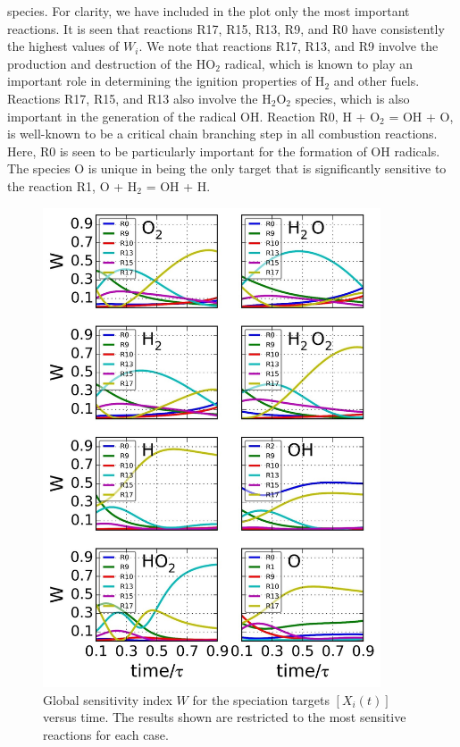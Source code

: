 species. For clarity, we have included in the plot only the most
important reactions. It is seen that reactions R17, R15, R13, R9,
and R0 have consistently the highest values of $W_i$. We note that
reactions R17, R13, and R9 involve the production and
destruction of the HO$_2$ radical, which is known to play an
important role in determining the ignition properties of H$_2$ and
other fuels.\cite{ch1_IRPC_5_westbrook2000chemical,ch3_47_killingsworth2011increased,ch3_48_keromnes2013experimental} Reactions R17, R15, and R13 also involve the
H$_2$O$_2$ species, which is also important in the generation of the
radical OH.\cite{ch3_49_lee1998hydrogen,ch3_50_zhou2012theoretical} Reaction R0, H + O$_2$ = OH + O, is well-known
to be a critical chain branching step in all combustion reactions.
Here, R0 is seen to be particularly important for the formation
of OH radicals. The species O is unique in being the only target
that is significantly sensitive to the reaction R1, O + H$_2$ = OH +
H.
\begin{figure}[htbp]
	\caption[Global sensitivity index $W$ versus time of H$_2$-O$_2$ combustion system]{Global sensitivity index $W$ for the speciation targets $\left[ X_i(t) \right]$ versus time. The results shown are restricted to the most sensitive reactions for each case.}
    \begin{center}
	\includegraphics[width=100mm]{figs/chapter3/fig4.jpg}
    \end{center}
\label{ch3:fig4}
\end{figure}
\newline
